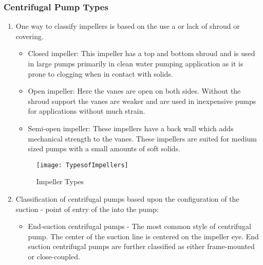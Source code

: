 \subsubsection{Centrifugal Pump Types}                                                               
\begin{enumerate}
\item One way to classify impellers is based on the use a or lack of shroud or covering. 
\begin{itemize}
\item Closed impeller: This impeller has a top and bottom shroud and is used in large pumps primarily in clean water pumping application as it is prone to clogging when in contact with solids.
\item Open impeller:  Here the vanes are open on both sides.  Without the shroud support the vanes are weaker and are used in inexpensive pumps for applications without much strain.
\item Semi-open impeller: These impellers have a back wall which adds mechanical strength to the vanes.  These impellers are suited for medium sized pumps with a small amounts of soft solids. 
\end{itemize}
\begin{figure}[h!]
\begin{center}
\texttt{[image: TypesofImpellers]}
\caption{Impeller Types}   
\end{center}
\end{figure}

\item Classification of centrifugal pumps based upon the configuration of the suction - point of entry of the into the pump:
\begin{itemize}
\item End-suction centrifugal pumps - The most common style of centrifugal pump. The center of the suction line is centered on the impeller eye. End suction centrifugal pumps are further classified as either frame-mounted or close-coupled.







\end{itemize}
\end{enumerate}
